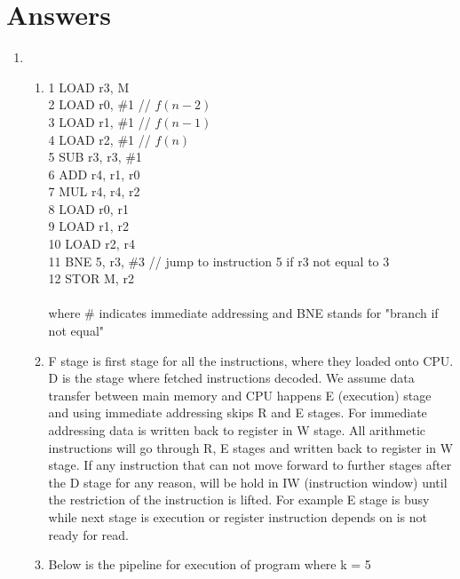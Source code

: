 \documentclass[12pt]{article}
\begin{document}
    \section*{Answers}
    \begin{enumerate}
        \item 
        \begin{enumerate}
            \item 1 LOAD r3, M\\
            2 LOAD r0, \#1  \hspace{1cm}// $f(n - 2)$\\
            3 LOAD r1, \#1 \hspace{1cm} // $f(n-1)$\\
            4 LOAD r2, \#1 \hspace{1cm} // $f(n)$\\
            5 SUB r3, r3, \#1\\
            6 ADD r4, r1, r0\\
            7 MUL r4, r4, r2\\
            8 LOAD r0, r1\\
            9 LOAD r1, r2\\
            10 LOAD r2, r4\\
            11 BNE 5, r3, \#3 \hspace{0.5cm} // jump to instruction 5 if r3 not equal to 3\\
            12 STOR M, r2\\
            \\
            where \# indicates immediate addressing and BNE stands for "branch if not equal"
            \\
            \item F stage is first stage for all the instructions, where they loaded onto CPU. D is the stage where fetched instructions decoded. We assume data transfer between main memory and CPU happens E (execution) stage and using immediate addressing skips R and E stages. For immediate addressing data is written back to register in W stage. All arithmetic instructions will go through R, E stages and written back to register in W stage. If any instruction that can not move forward to further stages after the D stage for any reason, will be hold in IW (instruction window) until the restriction of the instruction is lifted. For example E stage is busy while next stage is execution or register instruction depends on is not ready for read.
            \clearpage
            \item Below is the pipeline for execution of program where k = 5

\end{enumerate}
\end{enumerate}
\end{document}
